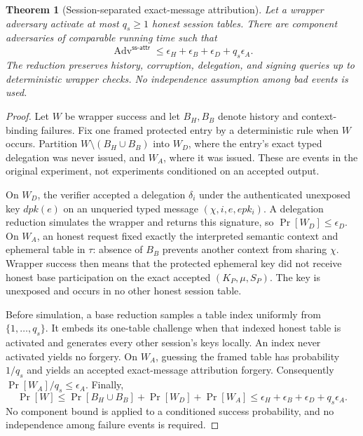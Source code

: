 \documentclass[11pt]{article}
\newtheorem{theorem}{Theorem}[section]
\theoremstyle{definition}
\begin{document}
\begin{theorem}[Session-separated exact-message attribution]\label{thm:composition}
Let a wrapper adversary activate at most $q_s\geq1$ honest session tables.  There are component adversaries of comparable running time such that
\begin{equation}
 \operatorname{Adv}^{\mathsf{ss\mbox{-}attr}}
 \leq \epsilon_H+\epsilon_B+\epsilon_D+q_s\epsilon_A.
 \label{eq:security-bound}
\end{equation}
The reduction preserves history, corruption, delegation, and signing queries up to deterministic wrapper checks.  No independence assumption among bad events is used.
\end{theorem}
\begin{proof}
Let $W$ be wrapper success and let $B_H,B_B$ denote history and context-binding failures.  Fix one framed protected entry by a deterministic rule when $W$ occurs.  Partition $W\setminus(B_H\cup B_B)$ into $W_D$, where the entry's exact typed delegation was never issued, and $W_A$, where it was issued.  These are events in the original experiment, not experiments conditioned on an accepted output.

On $W_D$, the verifier accepted a delegation $\delta_i$ under the authenticated unexposed key $dpk(e)$ on an unqueried typed message $(\chi,i,e,epk_i)$.  A delegation reduction simulates the wrapper and returns this signature, so $\Pr[W_D]\leq\epsilon_D$.  On $W_A$, an honest request fixed exactly the interpreted semantic context and ephemeral table in $\tau$: absence of $B_B$ prevents another context from sharing $\chi$.  Wrapper success then means that the protected ephemeral key did not receive honest base participation on the exact accepted $(K_P,\mu,S_P)$.  The key is unexposed and occurs in no other honest session table.

Before simulation, a base reduction samples a table index uniformly from $\{1,\ldots,q_s\}$.  It embeds its one-table challenge when that indexed honest table is activated and generates every other session's keys locally.  An index never activated yields no forgery.  On $W_A$, guessing the framed table has probability $1/q_s$ and yields an accepted exact-message attribution forgery.  Consequently $\Pr[W_A]/q_s\leq\epsilon_A$.  Finally,
\[
 \Pr[W]\leq\Pr[B_H\cup B_B]+\Pr[W_D]+\Pr[W_A]
 \leq\epsilon_H+\epsilon_B+\epsilon_D+q_s\epsilon_A.
\]
No component bound is applied to a conditioned success probability, and no independence among failure events is required.
\end{proof}
\end{document}
